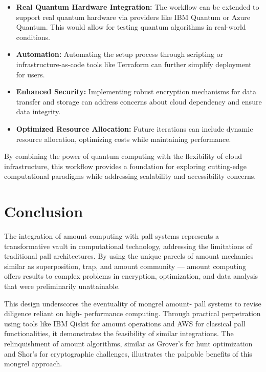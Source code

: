 \documentclass[conference]{IEEEtran}
\begin{document}
\begin{itemize}
    \item \textbf{Real Quantum Hardware Integration:} The workflow can be extended to support real quantum hardware via providers like IBM Quantum or Azure Quantum. This would allow for testing quantum algorithms in real-world conditions.

    \item \textbf{Automation:} Automating the setup process through scripting or infrastructure-as-code tools like Terraform can further simplify deployment for users.

    \item \textbf{Enhanced Security:} Implementing robust encryption mechanisms for data transfer and storage can address concerns about cloud dependency and ensure data integrity.

    \item \textbf{Optimized Resource Allocation:} Future iterations can include dynamic resource allocation, optimizing costs while maintaining performance.
\end{itemize}

By combining the power of quantum computing with the flexibility of cloud infrastructure, this workflow provides a foundation for exploring cutting-edge computational paradigms while addressing scalability and accessibility concerns.



\begin{center}
    \fontsize{14}{16}\selectfont \bfseries
    \section{Conclusion}
\end{center}

The integration of amount computing with pall systems represents a transformative vault in computational technology, addressing the limitations of traditional pall architectures. By using the unique parcels of amount mechanics similar as superposition, trap, and amount community — amount computing offers results to complex problems in encryption, optimization, and data analysis that were preliminarily unattainable.

This design underscores the eventuality of mongrel amount- pall systems to revise diligence reliant on high- performance computing. Through practical perpetration using tools like IBM Qiskit for amount operations and AWS for classical pall functionalities, it demonstrates the feasibility of similar integrations. The relinquishment of amount algorithms, similar as Grover's for hunt optimization and Shor's for cryptographic challenges, illustrates the palpable benefits of this mongrel approach.
\end{document}
